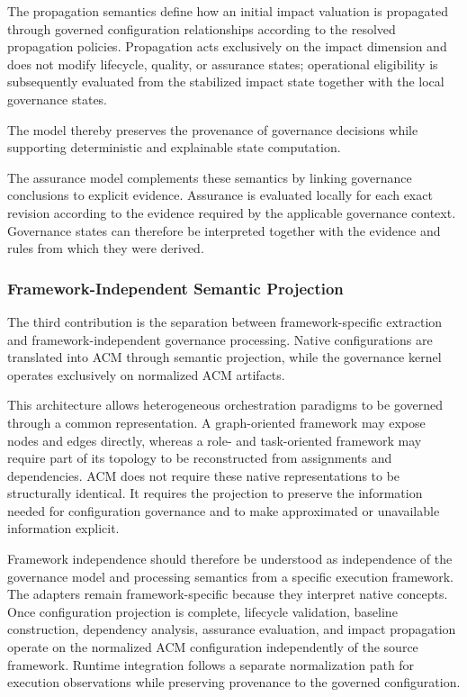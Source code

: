 \documentclass[10pt]{article}
\begin{document}
The propagation semantics define how an initial impact valuation is propagated through governed configuration relationships according to the resolved propagation policies. Propagation acts exclusively on the impact dimension and does not modify lifecycle, quality, or assurance states; operational eligibility is subsequently evaluated from the stabilized impact state together with the local governance states.

The model thereby preserves the provenance of governance decisions while supporting deterministic and explainable state computation.

The assurance model complements these semantics by linking governance conclusions to explicit evidence. Assurance is evaluated locally for each exact revision according to the evidence required by the applicable governance context. Governance states can therefore be interpreted together with the evidence and rules from which they were derived.

\subsubsection{Framework-Independent Semantic Projection}

The third contribution is the separation between framework-specific extraction and framework-independent governance processing. Native configurations are translated into ACM through semantic projection, while the governance kernel operates exclusively on normalized ACM artifacts.

This architecture allows heterogeneous orchestration paradigms to be governed through a common representation. A graph-oriented framework may expose nodes and edges directly, whereas a role- and task-oriented framework may require part of its topology to be reconstructed from assignments and dependencies. ACM does not require these native representations to be structurally identical. It requires the projection to preserve the information needed for configuration governance and to make approximated or unavailable information explicit.

Framework independence should therefore be understood as independence of the governance model and processing semantics from a specific execution framework. The adapters remain framework-specific because they interpret native concepts. Once configuration projection is complete, lifecycle validation, baseline construction, dependency analysis, assurance evaluation, and impact propagation operate on the normalized ACM configuration independently of the source framework. Runtime integration follows a separate normalization path for execution observations while preserving provenance to the governed configuration.
\end{document}
